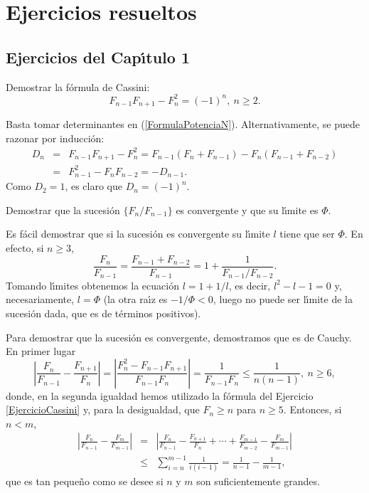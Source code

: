 \chapter{Ejercicios resueltos}
\label{ApendiceEjercicios}

\section{Ejercicios del Cap\'\i tulo 1}

\begin{ejercicio}\label{EjercicioCassini} Demostrar la f\'ormula de Cassini:
$$F_{n-1}F_{n+1}-F_n^2=(-1)^n,\ n\geq 2.$$
\end{ejercicio}

\begin{solucion}
Basta tomar determinantes en (\ref{FormulaPotenciaN}). Alternativamente, se puede razonar por inducci\'on:
\begin{eqnarray*}D_n&=&F_{n-1}F_{n+1}-F_n^2=F_{n-1}(F_n+F_{n-1})-F_n(F_{n-1}+F_{n-2})\\ &=&
F_{n-1}^2-F_nF_{n-2}=-D_{n-1}.\end{eqnarray*}
Como $D_2=1$, es claro que $D_n=(-1)^n$.
\end{solucion}

\begin{ejercicio}\label{EjercicioConvergencia} Demostrar que la sucesi\'on $\{F_n/F_{n-1}\}$ es convergente y que su l\'\i mite es $\Phi$.
\end{ejercicio}

\begin{solucion}
Es f\'acil demostrar que si la sucesi\'on es convergente su l\'\i mite $l$ tiene que ser $\Phi$. En efecto, si $n\geq 3$,
$$\frac{F_n}{F_{n-1}}=\frac{F_{n-1}+F_{n-2}}{F_{n-1}}=1+\frac{1}{F_{n-1}/F_{n-2}}.$$
Tomando l\'\i mites obtenemos la ecuaci\'on $l=1+1/l$, es decir, $l^2-l-1=0$ y, necesariamente, $l=\Phi$ (la otra ra\'\i z es $-1/\Phi<0$, luego no puede ser l\'\i mite de la sucesi\'on dada, que es de t\'erminos positivos).

Para demostrar que la sucesi\'on es convergente, demostramos que es de Cauchy. En primer lugar
$$\left|\frac{F_n}{F_{n-1}}-\frac{F_{n+1}}{F_n}\right|=\left|\frac{F_n^2-F_{n-1}F_{n+1}}{F_{n-1}F_n}\right|=\frac{1}{F_{n-1}F_n}\leq \frac{1}{n(n-1)},\ n\geq 6,$$
donde, en la segunda igualdad hemos utilizado la f\'ormula  del Ejercicio \ref{EjercicioCassini} y, para la desigualdad, que $F_n\geq n$ para $n\geq 5$.
Entonces, si $n<m$,
\begin{eqnarray*}\left|\frac{F_n}{F_{n-1}}-\frac{F_m}{F_{m-1}}\right|&=&
\left|\frac{F_n}{F_{n-1}}-\frac{F_{n+1}}{F_n}+\cdots +\frac{F_{m-1}}{F_{m-2}}-\frac{F_m}{F_{m-1}}\right|\\ &\leq& \sum_{i=n}^{m-1}\frac{1}{i(i-1)}=\frac{1}{n-1}-\frac{1}{m-1},\end{eqnarray*}
que es tan peque\~no como se desee si $n$ y $m$ son suficientemente grandes.
\end{solucion}


